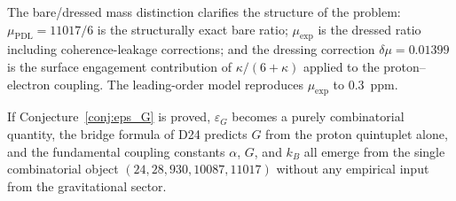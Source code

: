 \documentclass[11pt,a4paper]{article}
\theoremstyle{definition}
\newcommand{\epsg}{\varepsilon_G}
\newcommand{\kap}{\kappa}
\newcommand{\muPDL}{\mu_{\mathrm{PDL}}}
\newcommand{\muexp}{\mu_{\mathrm{exp}}}
\begin{document}
The bare/dressed mass distinction clarifies the structure of the problem: $\muPDL = 11017/6$ is the structurally exact bare ratio; $\muexp$ is the dressed ratio including coherence-leakage corrections; and the dressing correction $\delta\mu = 0.01399$ is the surface engagement contribution of $\kap/(6+\kap)$ applied to the proton--electron coupling. The leading-order model reproduces $\muexp$ to 0.3~ppm.

If Conjecture~\ref{conj:eps_G} is proved, $\epsg$ becomes a purely combinatorial quantity, the bridge formula of D24 predicts $G$ from the proton quintuplet alone, and the fundamental coupling constants $\alpha$, $G$, and $k_B$ all emerge from the single combinatorial object $(24, 28, 930, 10087, 11017)$ without any empirical input from the gravitational sector.



\end{document}
